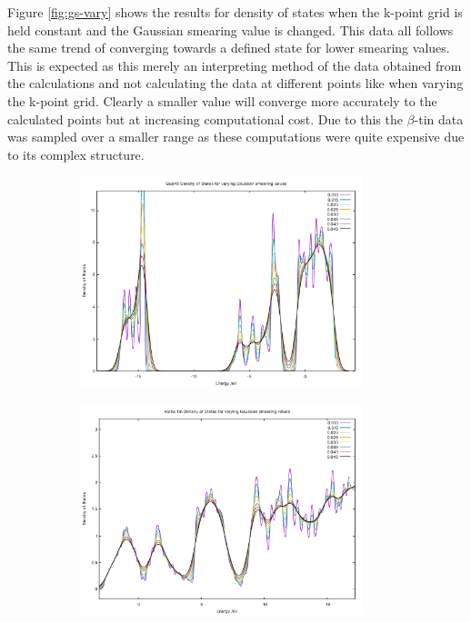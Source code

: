 \documentclass[12pt]{article}
\begin{document}
\noindent Figure \ref{fig:gs-vary} shows the results for density of states when the k-point grid is held constant and the Gaussian smearing value is changed. This data all follows the same trend of converging towards a defined state for lower smearing values. This is expected as this merely an interpreting method of the data obtained from the calculations and not calculating the data at different points like when varying the k-point grid. Clearly a smaller value will converge more accurately to the calculated points but at increasing computational cost. Due to this the $\beta$-tin data was sampled over a smaller range as these computations were quite expensive due to its complex structure.

\begin{figure}[h!!!!!]
	\centering
	\begin{subfigure}[t]{0.5\textwidth}
		\includegraphics[width=8.2cm]{quartz-dos-data/quartz-smear-vary-dos.pdf}
		\label{fig:quartz-gs-dos}
	\end{subfigure}%
	\begin{subfigure}[t]{0.5\textwidth}
		\includegraphics[width=8.2cm]{alpha-dos-data/alpha-smear-vary-dos.pdf}
		\label{fig:alpha-gs-dos}
	\end{subfigure}%

\end{figure}
\end{document}
